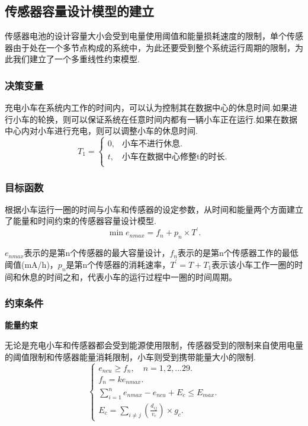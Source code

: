 \documentclass{whutmod}
\begin{document}
\subsection{传感器容量设计模型的建立}
传感器电池的设计容量大小会受到电量使用阈值和能量损耗速度的限制，单个传感器由于处在一个多节点构成的系统中，为此还要受到整个系统运行周期的限制，为此我们建立了一个多重线性约束模型.
\subsubsection{决策变量}
充电小车在系统内工作的时间内，可以认为控制其在数据中心的休息时间.如果进行小车的轮换，则可以保证系统在任意时间内都有一辆小车正在运行.如果在数据中心内对小车进行充电，则可以调整小车的休息时间.
\begin{equation}
	T_{1}=\begin{cases} 
		0,&\text{小车不进行休息.} \\
		t,&\text{小车在数据中心修整t的时长}. \\
	\end{cases}
\end{equation}


\subsubsection{目标函数}
根据小车运行一圈的时间与小车和传感器的设定参数，从时间和能量两个方面建立了能量和时间约束的传感器容量设计模型.
\begin{equation}
	\min e_{nmax}=f_{n}+p_{n}\times T^{\prime}.
\end{equation}

$e_{nmax}$表示的是第n个传感器的最大容量设计，$f_{n}$表示的是第n个传感器工作的最低阈值(mA/h)，$p_{n}$是第n个传感器的消耗速率，$T^{\prime}=T+T_{1}$表示该小车工作一圈的时间和休息的时间之和，代表小车的运行过程中一圈的时间周期。
\subsubsection{约束条件}
\textbf{能量约束}

无论是充电小车和传感器都会受到能源使用限制，传感器受到的限制来自使用电量的阈值限制和传感器能量消耗限制，小车则受到携带能量大小的限制.
\begin{equation}
	\left\{\begin{array}{l}
		e_{ncu} \geq f_{n},\quad n=1,2,...29.\\
		f_{n}=ke_{nmax}.\\
		\sum_{i=1}^{n} e_{nmax}-e_{ncu}+E_{c} \leq E_{max}.\\
		E_{c} =\sum_{i\neq j}(\frac{d_{ij}}{v_{c}}) \times g_{c}.
	\end{array}\right.
\end{equation}
\end{document}
